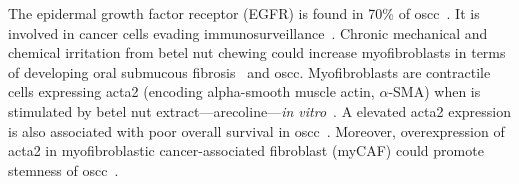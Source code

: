 \documentclass[12pt, a4paper]{article}
\begin{document}
The epidermal growth factor receptor (EGFR) is found in 70\% of \acrshort{oscc}~\citep{O-Charoenrat2000, Bentzen2005}.
It is involved in cancer cells evading immunosurveillance~\citep{Stefanidakis2006}.
Chronic mechanical and chemical irritation from betel nut chewing could increase myofibroblasts in terms of developing oral submucous fibrosis~\citep{Angadi2011} and \acrshort{oscc}.
Myofibroblasts are contractile cells expressing \acrfull{acta2} (encoding alpha-smooth muscle actin, $\alpha$-SMA) when is stimulated by betel nut extract---arecoline---\textit{\selectfont in vitro}~\citep{Chang2014}.
A elevated \acrshort{acta2} expression is also associated with poor overall survival in \acrshort{oscc}~\citep{Marsh2011}.
Moreover, overexpression of \acrshort{acta2} in myofibroblastic cancer-associated fibroblast (myCAF) could promote stemness of \acrshort{oscc}~\citep{Patel2018, Joshi2021}.
\end{document}
